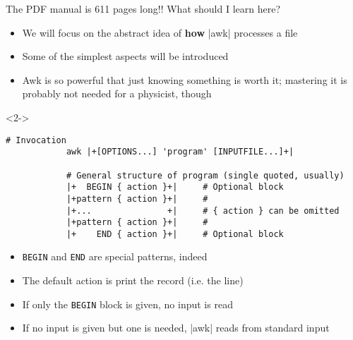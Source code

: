\begin{frame}[fragile]{The PDF manual is 611 pages long!! What should I learn here?}
    \vspace{-4mm}
    \begin{itemize}
        \item We will focus on the abstract idea of \textbf{how} \bash|awk| processes a file
        \item Some of the simplest aspects will be introduced
        \item Awk is so powerful that just knowing something is worth it; mastering it is probably not needed for a physicist, though
    \end{itemize}
    \begin{uncoverenv}<2->
        \begin{lstlisting}[style=MyBash, numbers=none, aboveskip=2mm, belowskip=-5mm]
            # Invocation
            awk |+[OPTIONS...] 'program' [INPUTFILE...]+|

            # General structure of program (single quoted, usually)
            |+  BEGIN { action }+|     # Optional block
            |+pattern { action }+|     #
            |+...               +|     # { action } can be omitted
            |+pattern { action }+|     #
            |+    END { action }+|     # Optional block
        \end{lstlisting}
    \end{uncoverenv}
    \begin{itemize}[<3>]
        \item \texttt{BEGIN} and \texttt{END} are special patterns, indeed
        \item The default action is print the record (i.e. the line)
        \item If only the \texttt{BEGIN} block is given, no input is read
        \item If no input is given but one is needed, \bash|awk| reads from standard input
    \end{itemize}
\end{frame}
